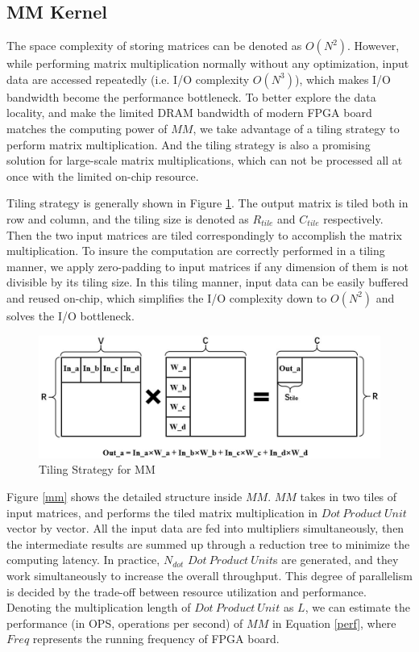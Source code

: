 \documentclass{acm_proc_article-sp-copy}
\begin{document}
\subsection{MM Kernel}
The space complexity of storing matrices can be denoted as $O(N^2)$. However, while performing matrix multiplication normally without any optimization, input data are accessed repeatedly (i.e. I/O complexity $O(N^3)$), which makes I/O bandwidth become the performance bottleneck. To better explore the data locality, and make the limited DRAM bandwidth of modern FPGA board matches the computing power of $MM$, we take advantage of a tiling strategy to perform matrix multiplication. And the tiling strategy is also a promising solution for large-scale matrix multiplications, which can not be processed all at once with the limited on-chip resource.

Tiling strategy is generally shown in Figure \ref{tile}. The output matrix is tiled both in row and column, and the tiling size is denoted as $R_{tile}$ and $C_{tile}$ respectively. Then the two input matrices are tiled correspondingly to accomplish the matrix multiplication. To insure the computation are correctly performed in a tiling manner, we apply zero-padding to input matrices if any dimension of them is not divisible by its tiling size. In this tiling manner, input data can be easily buffered and reused on-chip, which simplifies the I/O complexity down to $O(N^2)$ and solves the I/O bottleneck.

\begin{figure}[h]
	\centering
	\includegraphics[width=1.0\linewidth]{figure/tile.jpg}
	\caption{Tiling Strategy for MM}
	\label{tile}
\end{figure}

Figure \ref{mm} shows the detailed structure inside $MM$. $MM$ takes in two tiles of input matrices, and performs the tiled matrix multiplication in $Dot\ Product\ Unit$ vector by vector. All the input data are fed into multipliers simultaneously, then the intermediate results are summed up through a reduction tree to minimize the computing latency. In practice, $N_{dot}$ $Dot\ Product\ Unit$s are generated, and they work simultaneously to increase the overall throughput. This degree of parallelism is decided by the trade-off between resource utilization and performance. Denoting the multiplication length of $Dot\ Product\ Unit$ as $L$, we can estimate the performance (in OPS, operations per second) of $MM$ in Equation \ref{perf}, where $Freq$ represents the running frequency of FPGA board.
\end{document}

